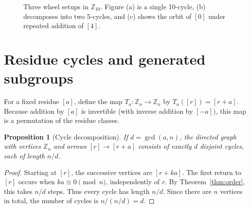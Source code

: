 \documentclass[11pt,a4paper]{article}
\newtheorem{proposition}[theorem]{Proposition}
\theoremstyle{definition}
\theoremstyle{remark}
\begin{document}
\begin{figure}[ht]
\centering
\begin{minipage}[t]{0.32\textwidth}
\centering
{}
\caption*{(a) Step size $1$}
\end{minipage}\hfill
\begin{minipage}[t]{0.32\textwidth}
\centering
{}
\caption*{(b) Step size $2$}
\end{minipage}\hfill
\begin{minipage}[t]{0.32\textwidth}
\centering
{}
\caption*{(c) Step size $4$}
\end{minipage}
\caption{Three wheel setups in $\mathbb Z_{10}$. Figure (a) is a single 10-cycle, (b) decomposes into two 5-cycles, and (c) shows the orbit of $[0]$ under repeated addition of $[4]$.}
\label{fig:cycle}
\end{figure}

\section{Residue cycles and generated subgroups}
For a fixed residue $[a]$, define the map $T_a:\mathbb Z_n\to\mathbb Z_n$ by $T_a([r])=[r+a]$. Because addition by $[a]$ is invertible (with inverse addition by $[-a]$), this map is a permutation of the residue classes.

\begin{proposition}[Cycle decomposition]\label{prop:cycles}
If $d=\gcd(a,n)$, the directed graph with vertices $\mathbb Z_n$ and arrows $[r]\to[r+a]$ consists of exactly $d$ disjoint cycles, each of length $n/d$.
\end{proposition}
\begin{proof}
Starting at $[r]$, the successive vertices are $[r+ka]$. The first return to $[r]$ occurs when $ka\equiv0\pmod n$, independently of $r$. By Theorem~\ref{thm:order}, this takes $n/d$ steps. Thus every cycle has length $n/d$. Since there are $n$ vertices in total, the number of cycles is $n/(n/d)=d$.
\end{proof}
\end{document}
